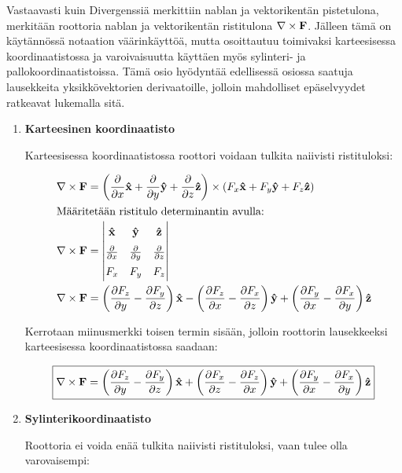 \documentclass[../johdoksia.tex]{subfiles}
\begin{document}
	Vastaavasti kuin Divergenssiä merkittiin nablan ja vektorikentän pistetulona, merkitään roottoria nablan ja vektorikentän ristitulona $\nabla\times\mathbf{F}$. Jälleen tämä on käytännössä notaation väärinkäyttöä, mutta osoittautuu toimivaksi karteesisessa koordinaatistossa ja varoivaisuutta käyttäen myös sylinteri- ja pallokoordinaatistoissa. Tämä osio hyödyntää edellisessä osiossa saatuja lausekkeita yksikkövektorien derivaatoille, jolloin mahdolliset epäselvyydet ratkeavat lukemalla sitä.
	
	\begin{enumerate}
		\item \textbf{Karteesinen koordinaatisto}
		
		Karteesisessa koordinaatistossa roottori voidaan tulkita naiivisti ristituloksi:
		
		\begin{align}
			\curlop\vtr{F} &= \left(\pdv{}{x}\unitv{x} + \pdv{}{y}\unitv{y} + \pdv{}{z}\unitv{z}\right)\times\left(F_x\unitv{x} + F_y\unitv{y} + F_z\unitv{z}\right) \\
			\intertext{Määritetään ristitulo determinantin avulla:}
			\curlop\vtr{F} &= 
			\begingroup
			\renewcommand*{\arraystretch}{1.5}
			\begin{vmatrix}
				\unitv{x} & \unitv{y} & \unitv{z} \\
				\pdv{}{x} & \pdv{}{y} & \pdv{}{z} \\
				F_x & F_y & F_z 
			\end{vmatrix}
			\endgroup \\
			\curlop\vtr{F} &= \left(\pdv{F_z}{y} - \pdv{F_y}{z}\right)\unitv{x} - \left(\pdv{F_z}{x} - \pdv{F_x}{z}\right)\unitv{y} + \left(\pdv{F_y}{x} - \pdv{F_x}{y}\right)\unitv{z}
		\end{align}
		
		\noindent Kerrotaan miinusmerkki toisen termin sisään, jolloin roottorin lausekkeeksi karteesisessa koordinaatistossa saadaan:
		
		\begin{equation}
			\boxed{\nabla\times\mathbf{F} = \left(\pdv{F_z}{y} - \pdv{F_y}{z}\right)\mathbf{\hat{x}} + \left(\pdv{F_x}{z} - \pdv{F_z}{x}\right)\mathbf{\hat{y}} + \left(\pdv{F_y}{x} - \pdv{F_x}{y}\right)\mathbf{\hat{z}}}
		\end{equation}
		
		\item \textbf{Sylinterikoordinaatisto}
		
		Roottoria ei voida enää tulkita naiivisti ristituloksi, vaan tulee olla varovaisempi:
		

\end{enumerate}
\end{document}
